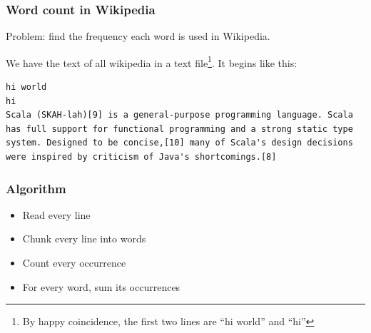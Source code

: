 \documentclass{beamer}
\begin{document}
{
  \pagecolor{white}
\begin{frame}[plain]

\end{frame}
}

\begin{frame}[fragile]
\frametitle{Word count in Wikipedia}

Problem: find the frequency each word is used in Wikipedia.

We have the text of all wikipedia in a text file\footnote{By happy coincidence, the first two lines are ``hi world'' and ``hi''}. It begins like this:

\begin{lstlisting}[backgroundcolor=\color{lightyellow},language={},postbreak={}, 
  breakautoindent=false, breakindent=0pt, breaklines]
hi world
hi
Scala (SKAH-lah)[9] is a general-purpose programming language. Scala has full support for functional programming and a strong static type system. Designed to be concise,[10] many of Scala's design decisions were inspired by criticism of Java's shortcomings.[8] 
\end{lstlisting}

\end{frame}

\begin{frame}[fragile]
\frametitle{Algorithm}

\begin{itemize}
  \item Read every line
  \item Chunk every line into words
  \item Count every occurrence
  \item For every word, sum its occurrences
\end{itemize}
\end{frame}
\end{document}
